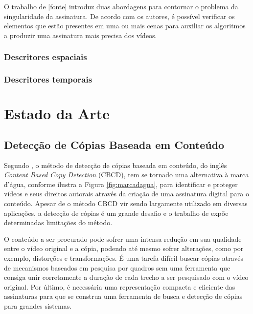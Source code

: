 O trabalho de [fonte] introduz duas abordagens para contornar o problema da singularidade da assinatura. De acordo com os autores, é possível verificar os elementos que estão presentes em uma ou mais cenas para auxiliar os algoritmos a produzir uma assinatura mais precisa dos vídeos.

\subsection{Descritores espaciais}
\label{descritores espaciais}

\subsection{Descritores temporais}
\label{Descritores espaciais}



\chapter{Estado da Arte}
\label{chap:estadodaarte}

     \section{Detecção de Cópias Baseada em Conteúdo} 
	Segundo \citeauthor{jiang2011pku}, o método de detecção de cópias baseada em conteúdo, do inglês \textit{Content Based Copy Detection} (CBCD), tem se tornado uma alternativa à marca d'água, conforme ilustra a Figura \ref{fig:marcadagua}, para identificar e proteger vídeos e seus direitos autorais através da criação de uma assinatura digital para o conteúdo. Apesar de o método CBCD vir sendo largamente utilizado em diversas aplicações, a detecção de cópias é um grande desafio e o trabalho de \citeauthor{jiang2011pku} expõe determinadas limitações do método.
    
    O conteúdo a ser procurado pode sofrer uma intensa redução em sua qualidade entre o vídeo original e a cópia, podendo até mesmo sofrer alterações, como por exemplo, distorções e transformações. É uma tarefa difícil buscar cópias através de mecanismos baseados em pesquisa por quadros sem uma ferramenta que consiga unir corretamente a duração de cada trecho a ser pesquisado com o vídeo original. Por último, é necessária uma representação compacta e eficiente das assinaturas para que se construa uma ferramenta de busca e detecção de cópias para grandes sistemas.
    

